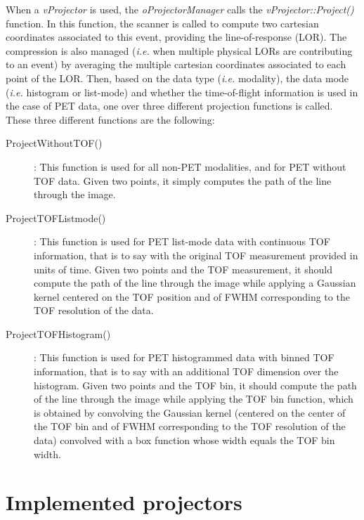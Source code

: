 \documentclass[a4paper, 11pt]{article}
\begin{document}
When a \textit{vProjector} is used, the \textit{oProjectorManager} calls the \textit{vProjector::Project()} function. In this function, the scanner is called to
compute two cartesian coordinates associated to this event, providing the line-of-response (LOR). The compression is also managed (\textit{i.e.} when multiple
physical LORs are contributing to an event) by averaging the multiple cartesian coordinates associated to each point of the LOR. Then, based on the data type
(\textit{i.e.} modality), the data mode (\textit{i.e.} histogram or list-mode) and whether the time-of-flight information is used in the case of PET data, one
over three different projection functions is called. These three different functions are the following:
\begin{description}
  \item[ProjectWithoutTOF()]: This function is used for all non-PET modalities, and for PET without TOF data. Given two points, it simply computes the path of
                              the line through the image.
  \item[ProjectTOFListmode()]: This function is used for PET list-mode data with continuous TOF information, that is to say with the original TOF measurement
                              provided in units of time. Given two points and the TOF measurement, it should compute the path of the line through the image while
                              applying a Gaussian kernel centered on the TOF position and of FWHM corresponding to the TOF resolution of the data.
  \item[ProjectTOFHistogram()]: This function is used for PET histogrammed data with binned TOF information, that is to say with an additional TOF dimension over
                              the histogram. Given two points and the TOF bin, it should compute the path of the line through the image while applying the TOF bin
                              function, which is obtained by convolving the Gaussian kernel (centered on the center of the TOF bin and of FWHM corresponding to the
                              TOF resolution of the data) convolved with a box function whose width equals the TOF bin width.
\end{description}

\section{Implemented projectors}
\end{document}
